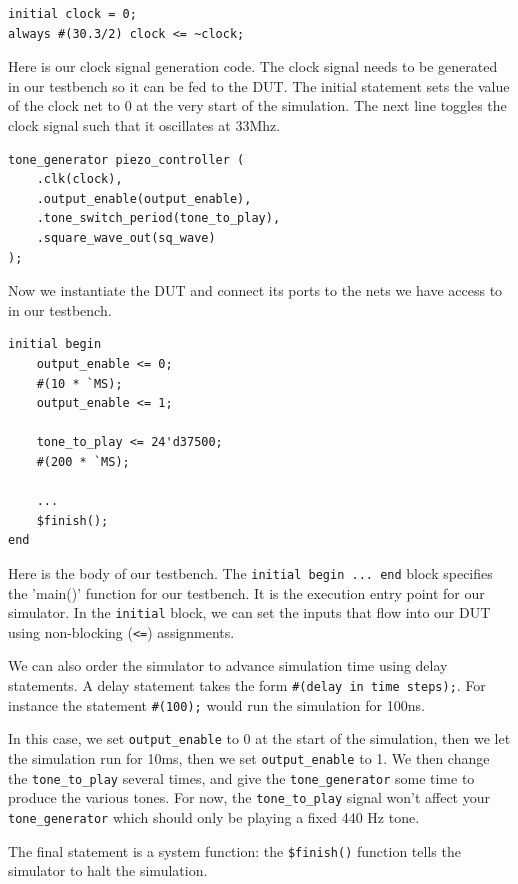 \documentclass[11pt]{article}
\begin{document}
\begin{verbatim}
initial clock = 0;
always #(30.3/2) clock <= ~clock;
\end{verbatim}

Here is our clock signal generation code. The clock signal needs to be generated in our testbench so it can be fed to the DUT. The initial statement sets the value of the clock net to 0 at the very start of the simulation. The next line toggles the clock signal such that it oscillates at 33Mhz.

\begin{verbatim}
tone_generator piezo_controller (
    .clk(clock),
    .output_enable(output_enable),
	.tone_switch_period(tone_to_play),
    .square_wave_out(sq_wave)
);
\end{verbatim}

Now we instantiate the DUT and connect its ports to the nets we have access to in our testbench.

\begin{verbatim}
initial begin
    output_enable <= 0;
    #(10 * `MS);
    output_enable <= 1;
    
    tone_to_play <= 24'd37500;
    #(200 * `MS);
   
    ...
    $finish();
end
\end{verbatim}

Here is the body of our testbench. The \verb|initial begin ... end| block specifies the 'main()' function for our testbench. It is the execution entry point for our simulator. In the \verb|initial| block, we can set the inputs that flow into our DUT using non-blocking (\verb|<=|) assignments.

We can also order the simulator to advance simulation time using delay statements. A delay statement takes the form \verb|#(delay in time steps);|. For instance the statement \verb|#(100);| would run the simulation for 100ns.

In this case, we set \verb|output_enable| to 0 at the start of the simulation, then we let the simulation run for 10ms, then we set \verb|output_enable| to 1. We then change the \verb|tone_to_play| several times, and give the \verb|tone_generator| some time to produce the various tones. For now, the \verb|tone_to_play| signal won't affect your \verb|tone_generator| which should only be playing a fixed 440 Hz tone.

The final statement is a system function: the \verb|$finish()| function tells the simulator to halt the simulation.
\end{document}
